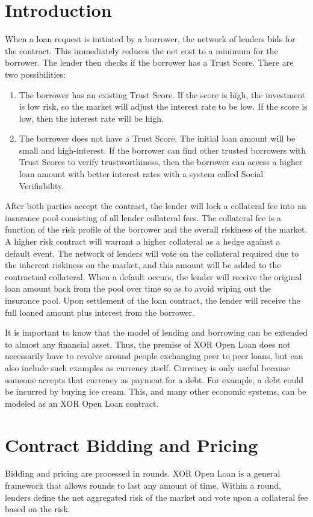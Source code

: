 \documentclass[twoside]{article}
\begin{document}
\section{Introduction}
When a loan request is initiated by a borrower, the network of lenders bids for the contract. This immediately reduces the net cost to a minimum for the borrower. The lender then checks if the borrower has a Trust Score. There are two possibilities: 
\begin{enumerate}
\item The borrower has an existing Trust Score. If the score is high, the investment is low risk, so the market will adjust the interest rate to be low. If the score is low, then the interest rate will be high. 
\item The borrower does not have a Trust Score. The initial loan amount will be small and high-interest. If the borrower can find other trusted borrowers with Trust Scores to verify trustworthiness, then the borrower can access a higher loan amount with better interest rates with a system called Social Verifiability.
\end{enumerate}

After both parties accept the contract, the lender will lock a collateral fee into an insurance pool consisting of all lender collateral fees. The collateral fee is a function of the risk profile of the borrower and the overall riskiness of the market. A higher risk contract will warrant a higher collateral as a hedge against a default event. The network of lenders will vote on the collateral required due to the inherent riskiness on the market, and this amount will be added to the contractual collateral. When a default occurs, the lender will receive the original loan amount back from the pool over time so as to avoid wiping out the insurance pool. Upon settlement of the loan contract, the lender will receive the full loaned amount plus interest from the borrower. 

It is important to know that the model of lending and borrowing can be extended to almost any financial asset. Thus, the premise of XOR Open Loan does not necessarily have to revolve around people exchanging peer to peer loans, but can also include such examples as currency itself. Currency is only useful because someone accepts that currency as payment for a debt. For example, a debt could be incurred by buying ice cream. This, and many other economic systems, can be modeled as an XOR Open Loan contract. 

\section{Contract Bidding and Pricing}
Bidding and pricing are processed in rounds. XOR Open Loan is a general framework that allows rounds to last any amount of time. Within a round, lenders define the net aggregated risk of the market and vote upon a collateral fee based on the risk. 
\end{document}
